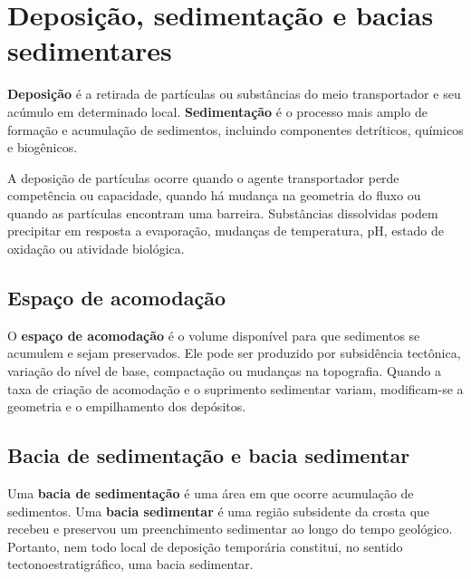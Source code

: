 \section{Deposição, sedimentação e bacias sedimentares}

\begin{definicao}
\textbf{Deposição} é a retirada de partículas ou substâncias do meio transportador e seu acúmulo em determinado local. \textbf{Sedimentação} é o processo mais amplo de formação e acumulação de sedimentos, incluindo componentes detríticos, químicos e biogênicos.
\end{definicao}

A deposição de partículas ocorre quando o agente transportador perde competência ou capacidade, quando há mudança na geometria do fluxo ou quando as partículas encontram uma barreira. Substâncias dissolvidas podem precipitar em resposta a evaporação, mudanças de temperatura, pH, estado de oxidação ou atividade biológica.

\subsection{Espaço de acomodação}

O \textbf{espaço de acomodação} é o volume disponível para que sedimentos se acumulem e sejam preservados. Ele pode ser produzido por subsidência tectônica, variação do nível de base, compactação ou mudanças na topografia. Quando a taxa de criação de acomodação e o suprimento sedimentar variam, modificam-se a geometria e o empilhamento dos depósitos.

\subsection{Bacia de sedimentação e bacia sedimentar}

Uma \textbf{bacia de sedimentação} é uma área em que ocorre acumulação de sedimentos. Uma \textbf{bacia sedimentar} é uma região subsidente da crosta que recebeu e preservou um preenchimento sedimentar ao longo do tempo geológico. Portanto, nem todo local de deposição temporária constitui, no sentido tectonoestratigráfico, uma bacia sedimentar.

